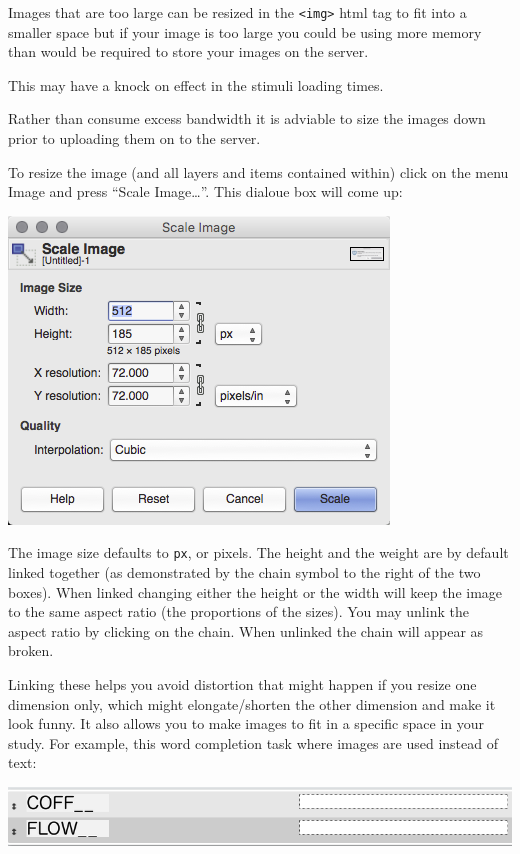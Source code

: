 \documentclass[]{book}
\begin{document}
Images that are too large can be resized in the \texttt{\textless{}img\textgreater{}} html tag to fit into a smaller space but if your image is too large you could be using more memory than would be required to store your images on the server.

This may have a knock on effect in the stimuli loading times.

Rather than consume excess bandwidth it is adviable to size the images down prior to uploading them on to the server.

To resize the image (and all layers and items contained within) click on the menu Image and press ``Scale Image\ldots{}''. This dialoue box will come up:

\includegraphics{images/screenshots/scale_image.png}

The image size defaults to \texttt{px}, or pixels. The height and the weight are by default linked together (as demonstrated by the chain symbol to the right of the two boxes). When linked changing either the height or the width will keep the image to the same aspect ratio (the proportions of the sizes). You may unlink the aspect ratio by clicking on the chain. When unlinked the chain will appear as broken.

Linking these helps you avoid distortion that might happen if you resize one dimension only, which might elongate/shorten the other dimension and make it look funny. It also allows you to make images to fit in a specific space in your study. For example, this word completion task where images are used instead of text:

\includegraphics{images/screenshots/image_size_example.png}
\end{document}
